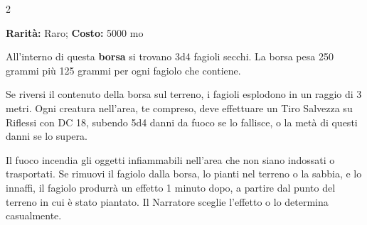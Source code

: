 \begin{multicols}{2}

\textbf{Rarità:} Raro; \textbf{Costo:} 5000 mo

All'interno di questa \textbf{borsa} si trovano 3d4 fagioli secchi. La borsa pesa 250 grammi più 125 grammi per ogni fagiolo che contiene.

Se riversi il contenuto della borsa sul terreno, i fagioli esplodono in un raggio di 3 metri. Ogni creatura nell'area, te compreso, deve effettuare un Tiro Salvezza su Riflessi con DC 18, subendo 5d4 danni da fuoco se lo fallisce, o la metà di questi danni se lo supera.

Il fuoco incendia gli oggetti infiammabili nell'area che non siano indossati o trasportati. Se rimuovi il fagiolo dalla borsa, lo pianti nel terreno o la sabbia, e lo innaffi, il fagiolo produrrà un effetto 1 minuto dopo, a partire dal punto del terreno in cui è stato piantato. Il Narratore sceglie l'effetto o lo determina casualmente.

\medskip


\end{multicols}
